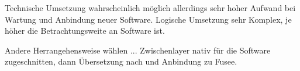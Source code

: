 
Technische Umsetzung wahrscheinlich möglich allerdings sehr hoher Aufwand bei Wartung und Anbindung neuer Software.
Logische Umsetzung sehr Komplex, je höher die Betrachtungsweite an Software ist.

Andere Herrangehensweise wählen ... Zwischenlayer nativ für die Software zugeschnitten, dann Übersetzung nach \CS und Anbindung zu Fusee.